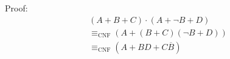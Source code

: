 \documentclass[12pt, letterpaper]{article}
\begin{document}
\begin{description}
        Proof: \begin{equation}\nonumber\begin{split}
            (A + B + C) \cdot (A + \lnot B + D) \\
            \equiv_\text{CNF} (A + (B + C)(\lnot B + D)) \\
            \equiv_\text{CNF} (A + BD + C \overline B)
        \end{split}\end{equation}

    \end{description}
\end{document}
